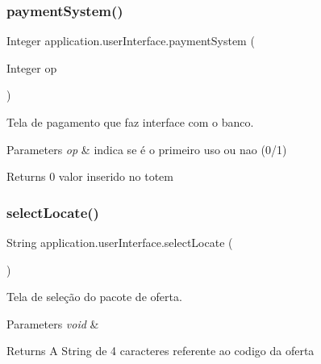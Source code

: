 \subsubsection{\texorpdfstring{paymentSystem()}{paymentSystem()}}
{\footnotesize\ttfamily Integer application.\+user\+Interface.\+payment\+System (\begin{DoxyParamCaption}\item[{Integer}]{op }\end{DoxyParamCaption})}



Tela de pagamento que faz interface com o banco. 


\begin{DoxyParams}{Parameters}
{\em op} & indica se é o primeiro uso ou nao (0/1) \\
\hline
\end{DoxyParams}
\begin{DoxyReturn}{Returns}
0 valor inserido no totem 
\end{DoxyReturn}
\mbox{\label{classapplication_1_1user_interface_aaac32b9a83abf1c16aac600e39f2a6e8}} 
\subsubsection{\texorpdfstring{selectLocate()}{selectLocate()}}
{\footnotesize\ttfamily String application.\+user\+Interface.\+select\+Locate (\begin{DoxyParamCaption}{ }\end{DoxyParamCaption})}



Tela de seleção do pacote de oferta. 


\begin{DoxyParams}{Parameters}
{\em void} & \\
\hline
\end{DoxyParams}
\begin{DoxyReturn}{Returns}
A String de 4 caracteres referente ao codigo da oferta 
\end{DoxyReturn}
\mbox{\label{classapplication_1_1user_interface_a8741d121e8719f84ff8516e2b7c0174f}} 
